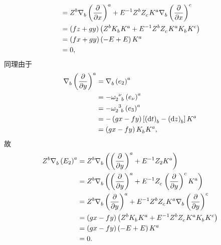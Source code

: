 \begin{xiti}
\begin{zm}
\begin{enumerate}[label=(\arabic*)]
\begin{equation*}
\begin{split}
						&= \tensor{Z}{^b} \Nabla{b} \tensor{\left( \pdv{x} \right)}{^a} + E^{-1} \tensor{Z}{^b} \tensor{Z}{_c} \tensor{K}{^a} \Nabla{b} \tensor{\left( \pdv{x} \right)}{^c}\\
						&= \left( fz+gy \right) \left( \tensor{Z}{^b} \tensor{K}{_b} \tensor{K}{^a} + E^{-1} \tensor{Z}{^b} \tensor{Z}{_c} \tensor{K}{^a} \tensor{K}{_b} \tensor{K}{^c} \right)\\
						&= \left( fx+gy \right) \left( - E + E \right) \tensor{K}{^a}\\
						&= 0,
					\end{split}
				\end{equation*}
				同理由于
				\begin{equation*}
					\begin{split}
						\Nabla{b} \tensor{\left( \pdv{y} \right)}{^a} &= \Nabla{b} \tensor{\left( e_2 \right)}{^a}\\
						&= - \tensor{\omega}{_2^\nu_b} \tensor{\left( e_\nu \right)}{^a}\\
						&= - \tensor{\omega}{_2^3_b} \tensor{\left( e_3 \right)}{^a}\\
						&= - \left( gx-fy \right) \left[ \tensor{\left( \dd{t} \right)}{_b} - \tensor{\left( \dd{z} \right)}{_b} \right] \tensor{K}{^a}\\
						&= \left( gx-fy \right) \tensor{K}{_b} \tensor{K}{^a},
					\end{split}
				\end{equation*}
				故
				\begin{equation*}
					\begin{split}
						\tensor{Z}{^b} \Nabla{b} \tensor{\left( E_2 \right)}{^a} &= \tensor{Z}{^b} \Nabla{b} \left( \tensor{\left( \pdv{y} \right)}{^a} + E^{-1} Z_2 \tensor{K}{^a} \right)\\
						&= \tensor{Z}{^b} \Nabla{b} \left( \tensor{\left( \pdv{y} \right)}{^a} + E^{-1} \tensor{Z}{_c} \tensor{\left( \pdv{y} \right)}{^c} \tensor{K}{^a} \right)\\
						&= \tensor{Z}{^b} \Nabla{b} \tensor{\left( \pdv{y} \right)}{^a} + E^{-1} \tensor{Z}{^b} \tensor{Z}{_c} \tensor{K}{^a} \Nabla{b} \tensor{\left( \pdv{y} \right)}{^c}\\
						&= \left( gx-fy \right) \left( \tensor{Z}{^b} \tensor{K}{_b} \tensor{K}{^a} + E^{-1} \tensor{Z}{^b} \tensor{Z}{_c} \tensor{K}{^a} \tensor{K}{_b} \tensor{K}{^c} \right)\\
						&= \left( gx-fy \right) \left( - E + E \right) \tensor{K}{^a}\\
						&= 0.
					\end{split}
				\end{equation*}
			\end{enumerate}
		\end{zm}


\end{xiti}
